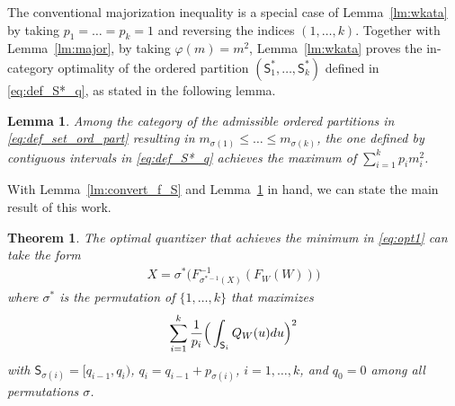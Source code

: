 \documentclass[10pt,a4paper]{amsart}
\newtheorem{theorem}{Theorem}%
\newtheorem{lemma}{Lemma}
\def\sS{{\mathsf S}}
\def\rd{{\rm d}}
\begin{document}
The conventional majorization inequality is a special case of Lemma~\ref{lm:wkata} by taking $p_1=\ldots=p_k=1$ and reversing the indices $(1,\ldots,k)$. 
Together with Lemma~\ref{lm:major}, by taking $\varphi(m)=m^2$, Lemma~\ref{lm:wkata} proves the in-category optimality of the ordered partition $(\sS^*_1,\ldots,\sS^*_k)$ defined in \eqref{eq:def_S*_q}, as stated in the following lemma.
\begin{lemma}\label{lm:in-catagory}
Among the category of the admissible ordered partitions in \eqref{eq:def_set_ord_part} resulting in $m_{\sigma(1)} \le \ldots \le m_{\sigma(k)}$, the one defined by contiguous intervals in \eqref{eq:def_S*_q} achieves the maximum of $\sum_{i=1}^k p_{i} m^{2}_{i}$.
\end{lemma}
With Lemma~\ref{lm:convert_f_S} and Lemma~\ref{lm:in-catagory} in hand, we can state the main result of this work.

\begin{theorem}\label{th:main}
The optimal quantizer that achieves the minimum in \eqref{eq:opt1} can take the form
\begin{align}
X = \sigma^*\big(F_{\sigma^{*-1}(X)}^{-1}(F_W(W))\big) \label{eq:thm_f}
\end{align}
where $\sigma^*$ is the permutation of $\{1,\ldots,k\}$ that maximizes
\begin{align}
    \sum_{i=1}^k \frac{1}{p_i} \Big(\int_{\sS_i}Q_W(u) \rd u \Big)^2 \label{eq:thm_Em^2}
\end{align}
with $\sS_{\sigma(i)} = [q_{i-1}, q_i)$, $q_i = q_{i-1} + p_{\sigma(i)}$, $i=1,\ldots,k$,
and $q_0 = 0$ among all permutations $\sigma$.
\end{theorem}
\end{document}
